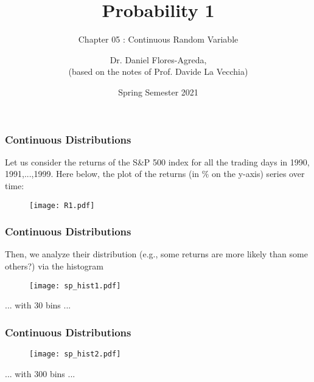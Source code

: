 \documentclass[notes=show,smaller,handout]{beamer}\usepackage[]{graphicx}\usepackage[]{color}
\begin{document}
\title[S110015]{Probability 1}
\subtitle{Chapter 05 : Continuous Random Variable}
\author[Flores-Agreda, La Vecchia]{Dr. Daniel Flores-Agreda, \\[0.5em] \tiny{(based on the notes of Prof. Davide La Vecchia)}}
\date{Spring Semester 2021}

\begin{frame}
\titlepage
\end{frame}



\begin{frame}%

\frametitle{Continuous Distributions}

\begin{example}
Let us consider the returns of the S\&P 500 index for all the trading days in 1990, 1991,...,1999. Here below, the plot of the returns (in $\%$ on the y-axis)
series over time:
\begin{figure}[ptb]\centering
\texttt{[image: R1.pdf]}
\end{figure}
\end{example}
\end{frame}

\begin{frame}%

\frametitle{Continuous Distributions}

\begin{example}[cont'd]
Then, we analyze their distribution (e.g., some returns are more likely than some others?) via the histogram
\begin{figure}[ptb]\centering
\texttt{[image: sp\_hist1.pdf]}
\end{figure}
... with 30 bins ...
\end{example}
\end{frame}


\begin{frame}%

\frametitle{Continuous Distributions}

\begin{example}[cont'd]
\begin{figure}[ptb]\centering
\texttt{[image: sp\_hist2.pdf]}
\end{figure}
... with 300 bins ...
\end{example}
\end{frame}
\end{document}
